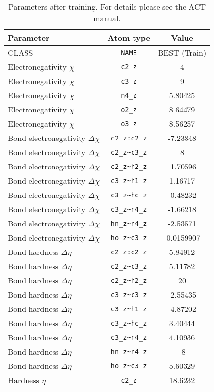 \begin{table}[ht]
\caption{Parameters after training. For details please see the ACT manual.}
\begin{tabular}{lcc}
\hline
Parameter & Atom type & Value \\ 
\hline
CLASS & \verb^NAME^ & BEST (Train) \\ 
Electronegativity $\chi$ & \verb^c2_z^ & 4 \\ 
Electronegativity $\chi$ & \verb^c3_z^ & 9 \\ 
Electronegativity $\chi$ & \verb^n4_z^ & 5.80425 \\ 
Electronegativity $\chi$ & \verb^o2_z^ & 8.64479 \\ 
Electronegativity $\chi$ & \verb^o3_z^ & 8.56257 \\ 
Bond electronegativity $\Delta\chi$ & \verb^c2_z:o2_z^ & -7.23848 \\ 
Bond electronegativity $\Delta\chi$ & \verb^c2_z~c3_z^ & 8 \\ 
Bond electronegativity $\Delta\chi$ & \verb^c2_z~h2_z^ & -1.70596 \\ 
Bond electronegativity $\Delta\chi$ & \verb^c3_z~h1_z^ & 1.16717 \\ 
Bond electronegativity $\Delta\chi$ & \verb^c3_z~hc_z^ & -0.48232 \\ 
Bond electronegativity $\Delta\chi$ & \verb^c3_z~n4_z^ & -1.66218 \\ 
Bond electronegativity $\Delta\chi$ & \verb^hn_z~n4_z^ & -2.53571 \\ 
Bond electronegativity $\Delta\chi$ & \verb^ho_z~o3_z^ & -0.0159907 \\ 
Bond hardness $\Delta\eta$ & \verb^c2_z:o2_z^ & 5.84912 \\ 
Bond hardness $\Delta\eta$ & \verb^c2_z~c3_z^ & 5.11782 \\ 
Bond hardness $\Delta\eta$ & \verb^c2_z~h2_z^ & 20 \\ 
Bond hardness $\Delta\eta$ & \verb^c3_z~c3_z^ & -2.55435 \\ 
Bond hardness $\Delta\eta$ & \verb^c3_z~h1_z^ & -4.87202 \\ 
Bond hardness $\Delta\eta$ & \verb^c3_z~hc_z^ & 3.40444 \\ 
Bond hardness $\Delta\eta$ & \verb^c3_z~n4_z^ & 4.10936 \\ 
Bond hardness $\Delta\eta$ & \verb^hn_z~n4_z^ & -8 \\ 
Bond hardness $\Delta\eta$ & \verb^ho_z~o3_z^ & 5.60329 \\ 
Hardness $\eta$ & \verb^c2_z^ & 18.6232 \\ 

\end{tabular}
\end{table}
